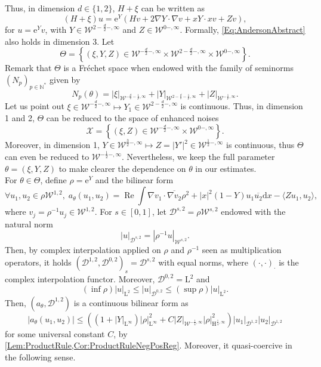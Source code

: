 \documentclass{article}
\def\W{\mathcal W}
\def\N{\mathbb N}
\def\L{\mathrm L}
\def\H{\mathrm H}
\DeclareMathOperator{\re}{Re}
\def\d{\mathrm{d}}
\theoremstyle{definition}
\numberwithin{equation}{section}
\newcommand{\e}{\mathrm{e}} %
\begin{document}
Thus, in dimension $d\in\{1,2\}$, $H+\xi$ can be written as
\begin{equation}\label{Eq:AndersonAbstract}
    (H+\xi)u=\e^{ Y}\left(H v + 2\nabla Y\cdot\nabla{v} + xY\cdot xv+ Zv\right),
\end{equation}
for $u=\e^Y v$, with $Y\in\W^{2-\frac{d}{2}-,\infty}$ and $Z\in\W^{0-,\infty}$. Formally, \cref{Eq:AndersonAbstract} also holds in dimension 3. Let
\begin{equation}\label{Def:ThetaAnderson}
    \Theta=\left\{(\xi,Y, Z)\in\W^{-\frac{d}{2}-,\infty}\times\W^{2-\frac{d}{2}-,\infty}\times\W^{0-,\infty}\right\}.
\end{equation}
Remark that $\Theta$ is a Fréchet space when endowed with the family of seminorms $(N_p)_{p\in\N^*}$ given by
$$N_p(\theta) = |\xi|_{\W^{-\frac{d}{2}-\frac{1}{p},\infty}}+|Y|_{\W^{2-\frac{d}{2}-\frac{1}{p},\infty}}+| Z|_{\W^{-\frac{1}{p},\infty}}.$$
Let us point out $\xi\in\W^{-\frac{d}{2}-,\infty}\mapsto Y_1\in\W^{2-\frac{d}{2}-,\infty}$ is continuous. Thus, in dimension 1 and 2, $\Theta$ can be reduced to the space of enhanced noises
\begin{equation}\label{Def:EnhancedNoiseSpace}
    \mathcal{X}=\left\{(\xi, Z)\in\W^{-\frac{d}{2}-,\infty}\times\W^{0-,\infty}\right\}.
\end{equation}
Moreover, in dimension 1, $Y\in\W^{\frac{3}{2}-,\infty}\mapsto Z=|Y'|^2\in\W^{\frac{1}{2}-,\infty}$ is continuous, thus $\Theta$ can even be reduced to $\W^{-\frac{1}{2}-,\infty}$. Nevertheless, we keep the full parameter $\theta=(\xi,Y,Z)$ to make clearer the dependence on $\theta$ in our estimates.\\

For $\theta\in\Theta$, define $\rho=\e^Y$ and the bilinear form
\begin{equation}\label{Def:AndersonBilinearForm}
    \forall u_1,u_2\in\rho\W^{1,2},\; a_\theta(u_1,u_2) = \re\int \nabla v_1\cdot\overline{\nabla v_2}\rho^2+|x|^2(1-Y)u_1\overline{u_2}\d x - \langle Zu_1,u_2\rangle,
\end{equation}
where $v_j=\rho^{-1}u_j\in\W^{1,2}$. For $s\in[0,1]$, let $\mathcal{D}^{s,2}=\rho\W^{s,2}$ endowed with the natural norm
$$\left|u\right|_{\mathcal{D}^{s,2}}=\left|\rho^{-1}u\right|_{\W^{s,2}}.$$
Then, by complex interpolation applied on $\rho$ and $\rho^{-1}$ seen as multiplication operators, it holds $\left(\mathcal{D}^{1,2},\mathcal{D}^{0,2}\right)_s=\mathcal{D}^{s,2}$ with equal norms,
where $(\cdot,\cdot)_{\cdot}$ is the complex interpolation functor. Moreover, $\mathcal{D}^{0,2}=\L^2$ and 
$$(\inf \rho)|u|_{\L^2}\leqslant|u|_{\mathcal{D}^{0,2}}\leqslant (\sup \rho)|u|_{\L^2}.$$
Then, $(a_\theta,\mathcal{D}^{1,2})$ is a continuous bilinear form as
\begin{equation}\label{Eq:GenContinuityEstimate1particle}
    |a_\theta(u_1,u_2)|\leqslant \left(\left(1+|Y|_{\L^\infty}\right)|\rho|_{\L^\infty}^2 + C|Z|_{\W^{-\frac{1}{4},\infty}}|\rho|_{\H^{\frac{1}{4},\infty}}^2\right)|u_1|_{\mathcal{D}^{1,2}}|u_2|_{\mathcal{D}^{1,2}}
\end{equation}
for some universal constant $C$, by \cref{Lem:ProductRule,Cor:ProductRuleNegPosReg}. Moreover, it quasi-coercive in the following sense.
\end{document}
